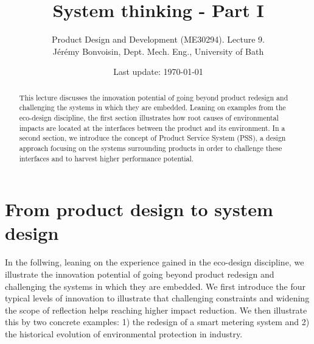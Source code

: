 \documentclass{article}
\begin{document}
\title{System thinking - Part I}

\author{Product Design and Development (ME30294). Lecture 9. \\ Jérémy Bonvoisin, Dept. Mech. Eng., University of Bath}
\date{Last update: \today}

\maketitle

\begin{abstract}
This lecture discusses the innovation potential of going beyond product redesign and challenging the systems in which they are embedded. Leaning on examples from the eco-design discipline, the first section illustrates how root causes of environmental impacts are located at the interfaces between the product and its environment. In a second section, we introduce the concept of Product Service System (PSS), a design approach focusing on the systems surrounding products in order to challenge these interfaces and to harvest higher performance potential. \end{abstract}

\tableofcontents

\section{From product design to system design}
\label{sec:FromIncrementalDesignToRethinkingSystems}
In the follwing, leaning on the experience gained in the eco-design discipline, we illustrate the innovation potential of going beyond product redesign and challenging the systems in which they are embedded. We first introduce the four typical levels of innovation to illustrate that challenging constraints and widening the scope of reflection helps reaching higher impact reduction. We then illustrate this by two concrete examples: 1) the redesign of a smart metering system and 2) the historical evolution of environmental protection in industry. 
\end{document}

